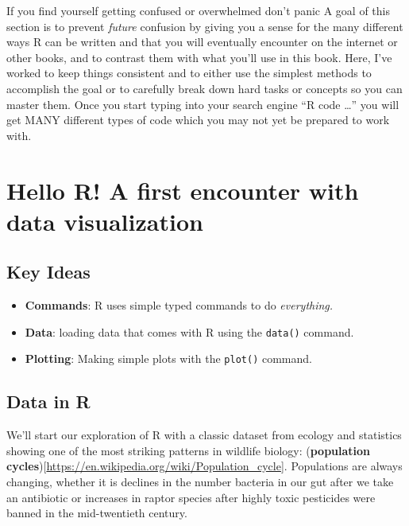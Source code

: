 \documentclass[
]{book}
\providecommand{\tightlist}{%
  \setlength{\itemsep}{0pt}\setlength{\parskip}{0pt}}
\begin{document}
If you find yourself getting confused or overwhelmed don't panic A goal of this section is to prevent \emph{future} confusion by giving you a sense for the many different ways R can be written and that you will eventually encounter on the internet or other books, and to contrast them with what you'll use in this book. Here, I've worked to keep things consistent and to either use the simplest methods to accomplish the goal or to carefully break down hard tasks or concepts so you can master them. Once you start typing into your search engine ``R code \ldots{}'' you will get MANY different types of code which you may not yet be prepared to work with.

\hypertarget{hello-r-a-first-encounter-with-data-visualization}{%
\chapter{Hello R! A first encounter with data visualization}\label{hello-r-a-first-encounter-with-data-visualization}}

\hypertarget{key-ideas}{%
\section{Key Ideas}\label{key-ideas}}

\begin{itemize}
\tightlist
\item
  \textbf{Commands}: R uses simple typed commands to do \emph{everything.}
\item
  \textbf{Data}: loading data that comes with R using the \texttt{data()} command.
\item
  \textbf{Plotting}: Making simple plots with the \texttt{plot()} command.
\end{itemize}

\hypertarget{data-in-r}{%
\section{Data in R}\label{data-in-r}}

We'll start our exploration of R with a classic dataset from ecology and statistics showing one of the most striking patterns in wildlife biology: (\textbf{population cycles}){[}\url{https://en.wikipedia.org/wiki/Population_cycle}{]}. Populations are always changing, whether it is declines in the number bacteria in our gut after we take an antibiotic or increases in
raptor species after highly toxic pesticides were banned in the mid-twentieth century.
\end{document}

